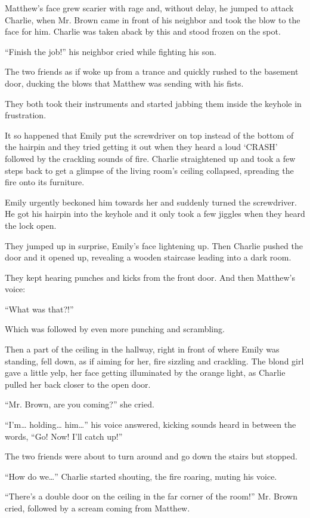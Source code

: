 Matthew's face grew scarier with rage and, without delay, he jumped to attack Charlie, when Mr. Brown came in front of his neighbor and took the blow to the face for him. Charlie was taken aback by this and stood frozen on the spot.

“Finish the job!” his neighbor cried while fighting his son.

The two friends as if woke up from a trance and quickly rushed to the basement door, ducking the blows that Matthew was sending with his fists.

They both took their instruments and started jabbing them inside the keyhole in frustration. 

It so happened that Emily put the screwdriver on top instead of the bottom of the hairpin and they tried getting it out when they heard a loud ‘CRASH' followed by the crackling sounds of fire. Charlie straightened up and took a few steps back to get a glimpse of the living room's ceiling collapsed, spreading the fire onto its furniture.

Emily urgently beckoned him towards her and suddenly turned the screwdriver. He got his hairpin into the keyhole and it only took a few jiggles when they heard the lock open.

They jumped up in surprise, Emily's face lightening up. Then Charlie pushed the door and it opened up, revealing a wooden staircase leading into a dark room.

They kept hearing punches and kicks from the front door. And then Matthew's voice:

“What was that?!”

Which was followed by even more punching and scrambling.

Then a part of the ceiling in the hallway, right in front of where Emily was standing, fell down, as if aiming for her, fire sizzling and crackling. The blond girl gave a little yelp, her face getting illuminated by the orange light, as Charlie pulled her back closer to the open door.

“Mr. Brown, are you coming?” she cried.

“I'm… holding… him…” his voice answered, kicking sounds heard in between the words, “Go! Now! I'll catch up!”

The two friends were about to turn around and go down the stairs but stopped.

“How do we…” Charlie started shouting, the fire roaring, muting his voice.

“There's a double door on the ceiling in the far corner of the room!” Mr. Brown cried, followed by a scream coming from Matthew.

